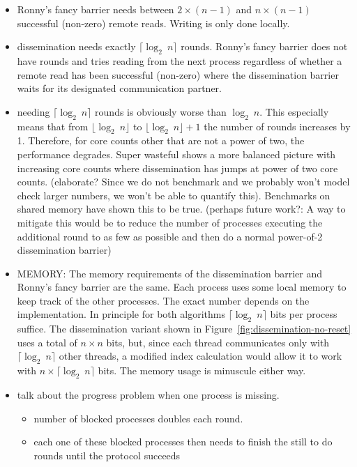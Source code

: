 \documentclass[a4paper, 10pt]{article}
\begin{document}
\begin{enumerate}
\begin{itemize}
	\item Ronny's fancy barrier needs between $2 \times (n-1)$ and $n \times (n-1)$ successful (non-zero) remote reads. Writing is only done locally.
	\item dissemination needs exactly $\lceil \log _2~n \rceil$ rounds. Ronny's fancy barrier does not have rounds and tries reading from the next process regardless of whether a remote read has been successful (non-zero) where the dissemination barrier waits for its designated communication partner.
	\item needing $\lceil \log _2~n \rceil$ rounds is obviously worse than $\log _2~n$. This especially means that from $\lfloor \log _2~n \rfloor$ to $\lfloor \log _2~n \rfloor + 1$ the number of rounds increases by 1. Therefore, for core counts other that are not a power of two, the performance degrades. Super wasteful shows a more balanced picture with increasing core counts where dissemination has jumps at power of two core counts. (elaborate? Since we do not benchmark and we probably won't model check larger numbers, we won't be able to quantify this). Benchmarks on shared memory have shown this to be true. (perhaps future work?: A way to mitigate this would be to reduce the number of processes executing the additional round to as few as possible and then do a normal power-of-2 dissemination barrier)
	\item MEMORY: The memory requirements of the dissemination barrier and Ronny's fancy barrier are the same. Each process uses some local memory to keep track of the other processes. The exact number depends on the implementation. In principle for both algorithms $\lceil \log _2~n \rceil$ bits per process suffice. The dissemination variant shown in Figure~\ref{fig:dissemination-no-reset} uses a total of $n \times n$ bits, but, since each thread communicates only with $\lceil \log _2~n \rceil$ other threads, a modified index calculation would allow it to work with $n \times \lceil \log _2 ~n \rceil$ bits. The memory usage is minuscule either way.
	\item talk about the progress problem when one process is missing.
		\begin{itemize}
			\item number of blocked processes doubles each round.
			\item each one of these blocked processes then needs to finish the still to do rounds until the protocol succeeds


\end{itemize}
\end{itemize}
\end{enumerate}
\end{document}
